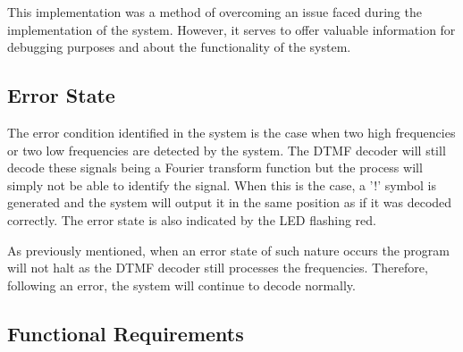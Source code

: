 \documentclass{cce2014-design}
\begin{document}
This implementation was a method of overcoming an issue faced during the implementation of the system.
However, it serves to offer valuable information for debugging purposes and about the functionality of the system.

\subsection{Error State}

The error condition identified in the system is the case when two high frequencies or two low frequencies are detected by the system.
The DTMF decoder will still decode these signals being a Fourier transform function but the process will simply not be able to identify the signal.
When this is the case, a '!' symbol is generated and the system will output it in the same position as if it was decoded correctly.
The error state is also indicated by the LED flashing red.

As previously mentioned, when an error state of such nature occurs the program will not halt as the DTMF decoder still processes the frequencies.
Therefore, following an error, the system will continue to decode normally.


\subsection{Functional Requirements}
\end{document}

